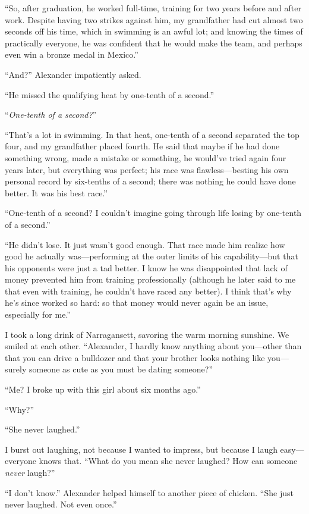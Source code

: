 ``So, after graduation, he worked full-time, training for two years
before and after work. Despite having two strikes against him, my
grandfather had cut almost two seconds off his time, which in swimming
is an awful lot; and knowing the times of practically everyone, he was
confident that he would make the team, and perhaps even win a bronze
medal in Mexico.''

``And?'' Alexander impatiently asked.

``He missed the qualifying heat by one-tenth of a second.''

``\emph{One-tenth of a second?}''

``That's a lot in swimming. In that heat, one-tenth of a second
separated the top four, and my grandfather placed fourth. He said that
maybe if he had done something wrong, made a mistake or something, he
would've tried again four years later, but everything was perfect; his
race was flawless---besting his own personal record by six-tenths of a
second; there was nothing he could have done better. It was his best
race.''

``One-tenth of a second? I couldn't imagine going through life losing by
one-tenth of a second.''

``He didn't lose. It just wasn't good enough. That race made him realize
how good he actually was---performing at the outer limits of his
capability---but that his opponents were just a tad better. I know he
was disappointed that lack of money prevented him from training
professionally (although he later said to me that even with training, he
couldn't have raced any better). I think that's why he's since worked so
hard: so that money would never again be an issue, especially for me.''

I took a long drink of Narragansett, savoring the warm morning sunshine.
We smiled at each other. ``Alexander, I hardly know anything about
you---other than that you can drive a bulldozer and that your brother
looks nothing like you---surely someone as cute as you must be dating
someone?''

``Me? I broke up with this girl about six months ago.''

``Why?''

``She never laughed.''

I burst out laughing, not because I wanted to impress, but because I
laugh easy---everyone knows that. ``What do you mean she never laughed?
How can someone \emph{never} laugh?''

``I don't know.'' Alexander helped himself to another piece of chicken.
``She just never laughed. Not even once.''

